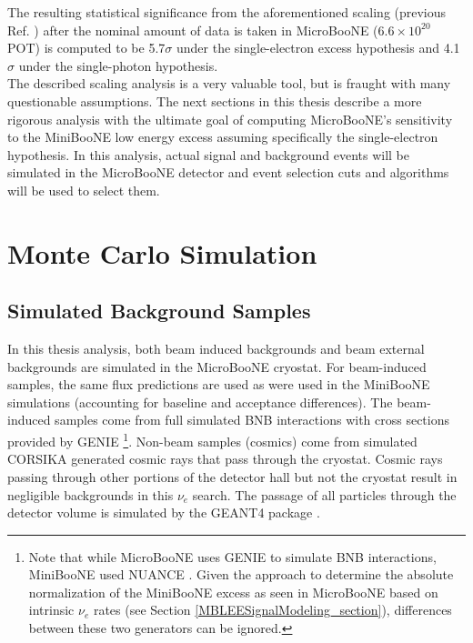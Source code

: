 The resulting statistical significance from the aforementioned scaling (previous Ref. \cite{UBTDR}) after the nominal amount of data is taken in MicroBooNE ($6.6\times 10^{20}$ POT) is computed to be 5.7$\sigma$ under the single-electron excess hypothesis and 4.1$\sigma$ under the single-photon hypothesis. \\

The described scaling analysis is a very valuable tool, but is fraught with many questionable assumptions. The next sections in this thesis describe a more rigorous analysis with the ultimate goal of computing MicroBooNE's sensitivity to the MiniBooNE low energy excess assuming specifically the single-electron hypothesis. In this analysis, actual signal and background events will be simulated in the MicroBooNE detector and event selection cuts and algorithms will be used to select them.














\section{Monte Carlo Simulation}

\subsection{Simulated Background Samples}\label{LEE_simulated_background_samples_section}
In this thesis analysis, both beam induced backgrounds and beam external backgrounds are simulated in the MicroBooNE cryostat. For beam-induced samples, the same flux predictions are used as were used in the MiniBooNE simulations (accounting for baseline and acceptance differences). The beam-induced samples come from full simulated BNB interactions with cross sections provided by GENIE \cite{GENIEsource}\footnote{Note that while MicroBooNE uses GENIE to simulate BNB interactions, MiniBooNE used NUANCE \cite{NUANCEsource}. Given the approach to determine the absolute normalization of the MiniBooNE excess as seen in MicroBooNE based on intrinsic $\nu_e$ rates (see Section \ref{MBLEESignalModeling_section}), differences between these two generators can be ignored.}. Non-beam samples (cosmics) come from simulated CORSIKA generated \cite{CORSIKAsource} cosmic rays that pass through the cryostat. Cosmic rays passing through other portions of the detector hall but not the cryostat result in negligible backgrounds in this $\nu_e$ search. The passage of all particles through the detector volume is simulated by the {\sc GEANT4} package \cite{GEANT4source}. 

